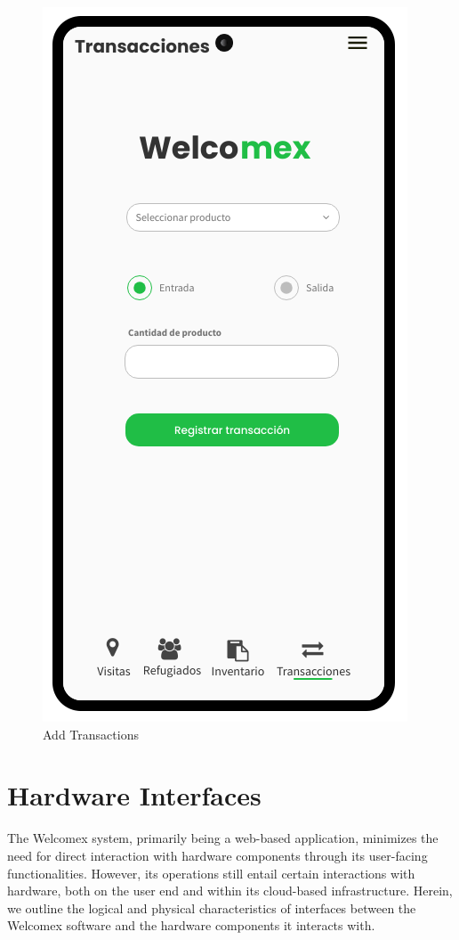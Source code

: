 \documentclass{scrreprt}
\begin{document}
\begin{figure}[H]
\begin{minipage}{0.48\textwidth}
     \includegraphics[width=.7\linewidth]{Transacciones}
     \caption{Add Transactions}\label{Fig:Data2}
   \end{minipage}
\end{figure}









\section{Hardware Interfaces}
The Welcomex system, primarily being a web-based application, minimizes the need for direct interaction with hardware components through its user-facing functionalities. However, its operations still entail certain interactions with hardware, both on the user end and within its cloud-based infrastructure. Herein, we outline the logical and physical characteristics of interfaces between the Welcomex software and the hardware components it interacts with.
\end{document}
